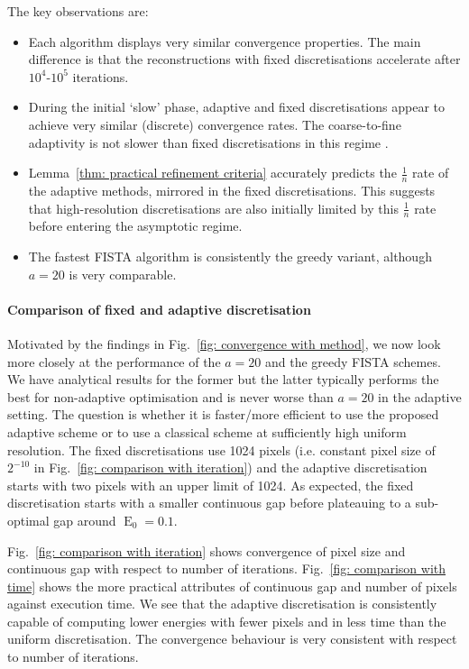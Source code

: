 \documentclass[smallextended]{svjour3}
\newcommand{\op}[1]{\operatorname{#1}}
\newcommand{\1}{\F{1}}
\newcommand{\edit}[3][1]{
	\IfEq{#1}{2}{\def\mysecondvar{}}{\def\mysecondvar{#2}}%
	\ifx\mysecondvar\empty{}\else{%
		\IfEq{#1}{1}{%
			\ifmmode%
			\text{\color{red}\sout{\ensuremath{#2}}}%
			\else%
			{\color{red} \sout{#2}}%
			\fi%
		}{\color{red}#2}\ %
	}\fi{\color{darkgreen}#3}}
\begin{document}
	The key observations are:
	\begin{itemize}
		\item Each algorithm displays very similar convergence properties. The main difference is that the reconstructions with fixed discretisations accelerate after $10^4$-$10^5$ iterations.
		\item During the initial `slow' phase, adaptive and fixed discretisations appear to achieve very similar (discrete) convergence rates. The coarse-to-fine adaptivity is not slower than fixed discretisations in this regime\edit{}{, consistent with \eqref{eq: slow exact FISTA}}.
		\item Lemma~\ref{thm: practical refinement criteria} accurately predicts the $\frac1n$ rate of the adaptive methods, mirrored in the fixed discretisations. This suggests that high-resolution discretisations are also initially limited by this $\frac1n$ rate before entering the asymptotic regime.
		\item The fastest FISTA algorithm is consistently the greedy variant, although $a=20$ is very comparable.
	\end{itemize}
	
	\paragraph{Comparison of fixed and adaptive discretisation}
	Motivated by the findings in Fig.~\ref{fig: convergence with method}, we now look more closely at the performance of the $a=20$ and the greedy FISTA schemes. We have analytical results for the former but the latter typically performs the best for non-adaptive optimisation and is never worse than $a=20$ in the adaptive setting. The question is whether it is faster/more efficient to use the proposed adaptive scheme or to use a classical scheme at sufficiently high uniform resolution. The fixed discretisations use 1024 pixels (i.e. constant pixel size of $2^{-10}$ in Fig.~\ref{fig: comparison with iteration}) and the adaptive discretisation starts with two pixels with an upper limit of 1024. As expected, the fixed discretisation starts with a smaller continuous gap before plateauing to a sub-optimal gap around $\op{E}_0=0.1$.
	
	Fig.~\ref{fig: comparison with iteration} shows convergence of pixel size and continuous gap with respect to number of iterations. Fig.~\ref{fig: comparison with time} shows the more practical attributes of continuous gap and number of pixels against execution time. We see that the adaptive discretisation is consistently capable of computing lower energies with fewer pixels and in less time than the uniform discretisation. The convergence behaviour is very consistent with respect to number of iterations.
	
\end{document}
